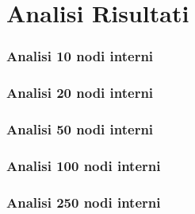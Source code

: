 \chapter{Analisi Risultati}
\subsection{Analisi 10 nodi interni}
\subsection{Analisi 20 nodi interni}
\subsection{Analisi 50 nodi interni}
\subsection{Analisi 100 nodi interni}
\subsection{Analisi 250 nodi interni}